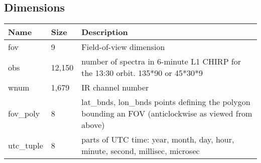 
\subsection{Dimensions}

\begin{center}
\begin{xltabular}{\textwidth}{|l|l|m{10cm}|}


\hline
Name & Size & Description\tabularnewline\hline
\hline
fov & 9 & Field-of-view dimension\tabularnewline\hline
obs & 12,150 & number of spectra in 6-minute L1 CHIRP for the 13:30
orbit. 135*90 or 45*30*9\tabularnewline\hline
wnum & 1,679 & IR channel number\tabularnewline\hline
fov\_poly & 8 & lat\_bnds, lon\_bnds points defining the polygon
bounding an FOV (anticlockwise as viewed from above)\tabularnewline\hline
utc\_tuple & 8 & parts of UTC time: year, month, day, hour, minute,
second, millisec, microsec\tabularnewline\hline

\end{xltabular}
\end{center}
